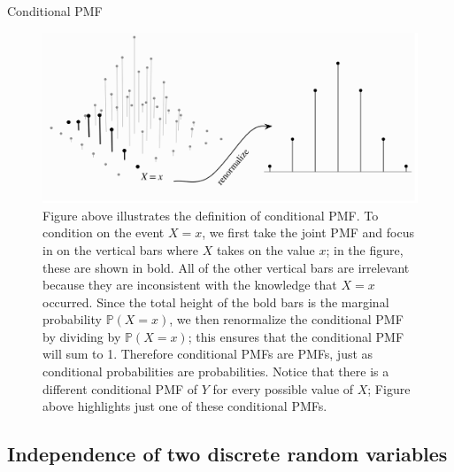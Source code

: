 \documentclass[8pt, usepdftitle=false]{beamer}
\begin{document}
\begin{frame}{Conditional PMF}
\begin{figure}
  \includegraphics[scale = .25]{Images/conditional_PMF.png}
    \caption{Figure above illustrates the definition of conditional PMF. To condition on the event $X=x$, we first take the joint PMF and focus in on the vertical bars where $X$ takes on the value $x$; in the figure, these are shown in bold. All of the other vertical bars are irrelevant because they are inconsistent with the knowledge that $X=x$ occurred. Since the total height of the bold bars is the marginal probability $\mathbb{P}(X=x)$, we then renormalize the conditional PMF by dividing by $\mathbb{P}(X=x)$; this ensures that the conditional PMF will sum to 1. Therefore conditional PMFs are PMFs, just as conditional probabilities are probabilities. Notice that there is a different conditional PMF of $Y$ for every possible value of $X$; Figure above highlights just one of these conditional PMFs.}
\end{figure}

\end{frame}


\subsection{Independence of two discrete random variables}
\end{document}
